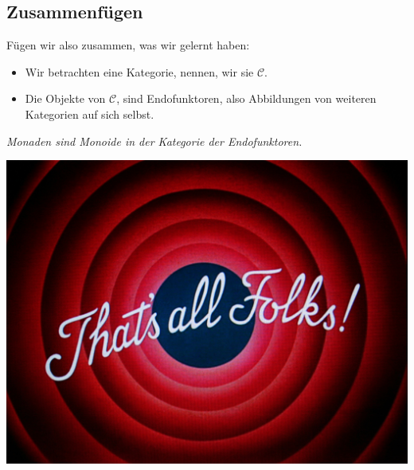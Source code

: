\documentclass{beamer}
\begin{document}
\subsection*{Zusammenfügen}

\begin{frame}

Fügen wir also zusammen, was wir gelernt haben:

\begin{itemize}
\pause\item Wir betrachten eine Kategorie, nennen, wir sie $\mathcal{C}$.
\pause\item Die Objekte von $\mathcal{C}$, sind Endofunktoren, also Abbildungen von weiteren Kategorien auf sich selbst.
\end{itemize}

\pause
\begin{center}
\textit{\glqq Monaden sind Monoide in der Kategorie der Endofunktoren.\grqq}
\end{center}

\end{frame}


\begin{frame}
\begin{center}
\includegraphics[scale=0.25]{thatsall.jpg} 
\end{center}
\end{frame}
\end{document}
